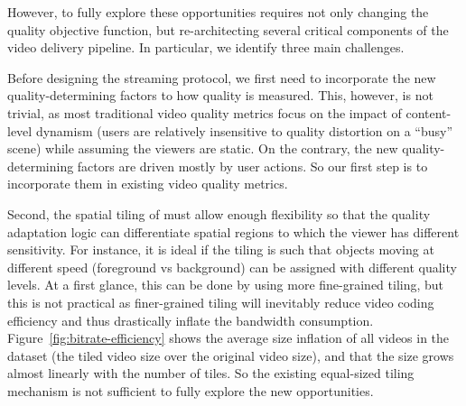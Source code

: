 However, to fully explore these opportunities requires not only changing the quality objective function, but re-architecting several critical components of the video delivery pipeline. 
In particular, we identify three main challenges.


Before designing the streaming protocol, we first need to incorporate the new quality-determining factors to how \vrvideo quality is measured. 
This, however, is not trivial, as most traditional video quality metrics focus on the impact of content-level dynamism (\eg users are relatively insensitive to quality distortion on a ``busy'' scene) while assuming the viewers are static.
On the contrary, the new quality-determining factors are driven mostly by user actions. 
So our first step is to incorporate them in existing video quality metrics.

Second, the spatial tiling of \vrvideos must allow enough flexibility so that the quality adaptation logic can differentiate spatial regions to which the viewer has different sensitivity. 
For instance, it is ideal if the tiling is such that objects moving at different speed (\eg foreground vs background) can be assigned with different quality levels.
At a first glance, this can be done by using more fine-grained tiling, but this is not practical as finer-grained tiling will inevitably reduce video  coding efficiency and thus drastically inflate the bandwidth consumption.
Figure~\ref{fig:bitrate-efficiency} shows the average size inflation of all videos in the dataset (the tiled video size over the original video size), and that the size grows almost linearly with the number of tiles. 
So the existing equal-sized tiling mechanism is not sufficient to fully explore the new opportunities.

